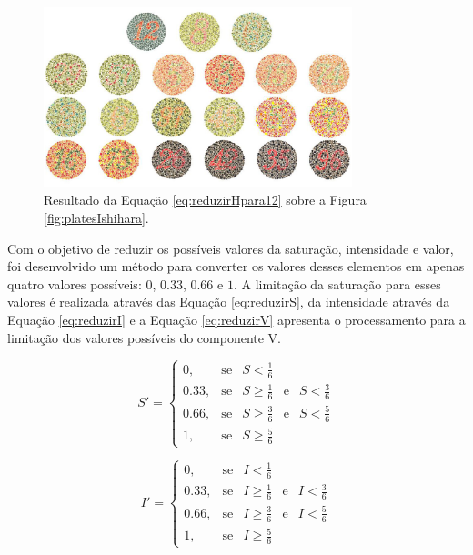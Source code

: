 \documentclass[	12pt, Times, openright, twoside, a4paper, english, brazil]{abntex2}
\begin{document}
\begin{figure}[!htb]
\centering \includegraphics[width=0.80\textwidth]{figuraDeslocarH12.jpg}
\caption{Resultado da Equação \ref{eq:reduzirHpara12} sobre a Figura \ref{fig:platesIshihara}. \label{fig:reduzirHpara12}}
\end{figure}

Com o objetivo de reduzir os possíveis valores da saturação, intensidade e valor, foi desenvolvido um método para converter os valores desses elementos em apenas quatro valores possíveis: $0$, $0.33$, $0.66$ e $1$. A limitação da saturação para esses valores é realizada através das Equação \ref{eq:reduzirS}, da intensidade através da Equação \ref{eq:reduzirI} e a Equação \ref{eq:reduzirV} apresenta o processamento para a limitação dos valores possíveis do componente V.

\begin{equation}
\label{eq:reduzirS}
S'=\left\{
\begin{array}{rclcl}
       0,   &\mbox{se}  & S <    \frac{1}{6}                                    \\
    0.33,   &\mbox{se}  & S \geq \frac{1}{6} & \mbox{e} & S < \frac{3}{6}       \\
    0.66,   &\mbox{se}  & S \geq \frac{3}{6} & \mbox{e} & S < \frac{5}{6}       \\
       1,   &\mbox{se}  & S \geq \frac{5}{6}
\end{array}\right.
\end{equation}

\begin{equation}
\label{eq:reduzirI}
I'=\left\{
\begin{array}{rclcl}
       0,   &\mbox{se}  & I <    \frac{1}{6}                        \\
    0.33,   &\mbox{se}  & I \geq \frac{1}{6} & \mbox{e} & I < \frac{3}{6}      \\
    0.66,   &\mbox{se}  & I \geq \frac{3}{6} & \mbox{e} & I < \frac{5}{6}      \\
       1,   &\mbox{se}  & I \geq \frac{5}{6}
\end{array}\right.
\end{equation}
\end{document}
